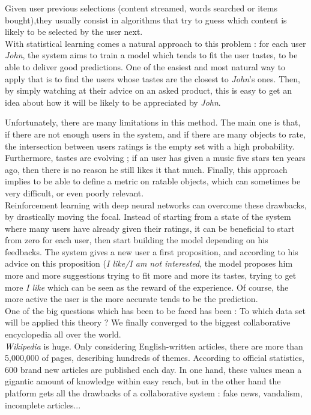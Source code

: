 \documentclass[11pt]{article}
\theoremstyle{plain}
\theoremstyle{definition}
\theoremstyle{remark}
\begin{document}
Given user previous selections (content streamed, words searched or items bought),they usually consist in algorithms that try to guess which content is likely to be selected by the user next. \\

With statistical learning comes a natural approach to this problem : for each user \textit{John}, the system aims to train a model which tends to fit the user tastes, to be able to deliver good predictions. One of the easiest and most natural way to apply that is to find the users whose tastes are the closest to \textit{John}'s ones. Then, by simply watching at their advice on an asked product, this is easy to get an idea about how it will be likely to be appreciated by \textit{John}.

Unfortunately, there are many limitations in this method. The main one is that, if there are not enough users in the system, and if there are many objects to rate, the intersection between users ratings is the empty set with a high probability. Furthermore, tastes are evolving ; if an user has given a music five stars ten years ago, then there is no reason he still likes it that much. Finally, this approach implies to be able to define a metric on ratable objects, which can sometimes be very difficult, or even poorly relevant. \\

Reinforcement learning with deep neural networks can overcome these drawbacks, by drastically moving the focal. Instead of starting from a state of the system where many users have already given their ratings, it can be beneficial to start from zero for each user, then start building the model depending on his feedbacks. The system gives a new user a first proposition, and according to his advice on this proposition (\textit{I like/I am not interested}, the model proposes him more and more suggestions trying to fit more and more its tastes, trying to get more \textit{I like} which can be seen as the reward of the experience. Of course, the more active the user is the more accurate tends to be the prediction. \\

One of the big questions which has been to be faced has been : To which data set will be applied this theory ? We finally converged to the biggest collaborative encyclopedia all over the world. \\

\textit{Wikipedia} is huge. Only considering English-written articles, there are more than 5,000,000 of pages, describing hundreds of themes. According to official statistics, 600 brand new articles are published each day. In one hand, these values mean a gigantic amount of knowledge within easy reach, but in the other hand the platform gets all the drawbacks of a collaborative system : fake news, vandalism, incomplete articles... 
\end{document}
